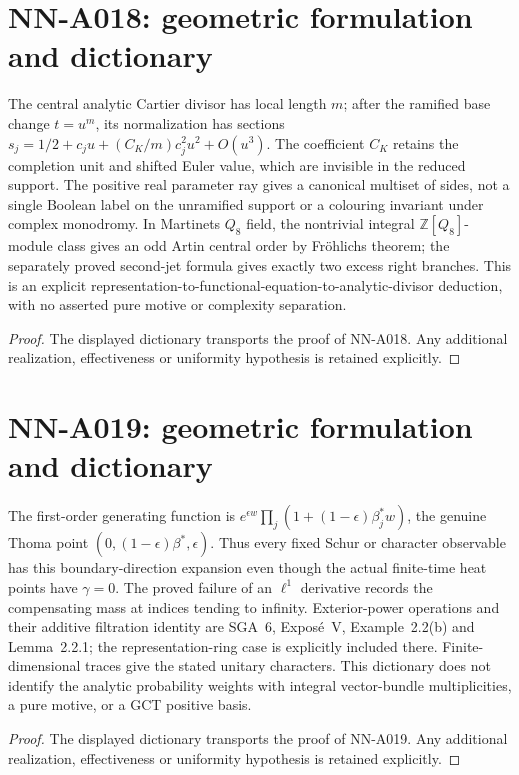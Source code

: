 \section{NN-A018: geometric formulation and dictionary}
\begin{geometricstatement}[NN-A018]
The central analytic Cartier divisor has local length $m$; after the ramified base change $t=u^m$, its normalization has sections $s_j=1/2+c_ju+(C_K/m)c_j^2u^2+O(u^3)$. The coefficient $C_K$ retains the completion unit and shifted Euler value, which are invisible in the reduced support. The positive real parameter ray gives a canonical multiset of sides, not a single Boolean label on the unramified support or a colouring invariant under complex monodromy. In Martinet\textquotesingle s $Q_8$ field, the nontrivial integral $\mathbb Z[Q_8]$-module class gives an odd Artin central order by Fr\"ohlich\textquotesingle s theorem; the separately proved second-jet formula gives exactly two excess right branches. This is an explicit representation-to-functional-equation-to-analytic-divisor deduction, with no asserted pure motive or complexity separation.
\end{geometricstatement}
\begin{proof} The displayed dictionary transports the proof of NN-A018. Any additional realization, effectiveness or uniformity hypothesis is retained explicitly.\end{proof}


\section{NN-A019: geometric formulation and dictionary}
\begin{geometricstatement}[NN-A019]
The first-order generating function is $e^{\epsilon w}\prod_j(1+(1-\epsilon)\beta_j^*w)$, the genuine Thoma point $(0,(1-\epsilon)\beta^*,\epsilon)$. Thus every fixed Schur or character observable has this boundary-direction expansion even though the actual finite-time heat points have $\gamma=0$. The proved failure of an $\ell^1$ derivative records the compensating mass at indices tending to infinity. Exterior-power operations and their additive filtration identity are SGA~6, Expos\'e~V, Example~2.2(b) and Lemma~2.2.1; the representation-ring case is explicitly included there. Finite-dimensional traces give the stated unitary characters. This dictionary does not identify the analytic probability weights with integral vector-bundle multiplicities, a pure motive, or a GCT positive basis.
\end{geometricstatement}
\begin{proof} The displayed dictionary transports the proof of NN-A019. Any additional realization, effectiveness or uniformity hypothesis is retained explicitly.\end{proof}


